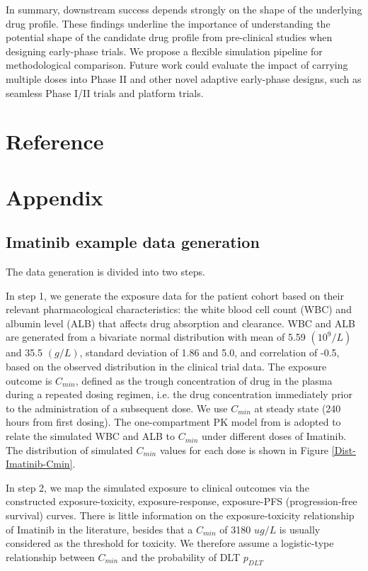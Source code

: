 \documentclass[11pt]{article}
\providecommand{\DIFaddtex}[1]{{\protect\color{blue}\uwave{#1}}} %
\providecommand{\DIFaddbegin}{} %
\providecommand{\DIFaddend}{} %
\providecommand{\DIFadd}[1]{\texorpdfstring{\DIFaddtex{#1}}{#1}} %
\newcommand{\DIFaddincludegraphics}[2][]{{\color{blue}\fbox{\DIFOincludegraphics[#1]{#2}}}} %
\DeclareRobustCommand{\DIFaddbegin}{\DIFOaddbegin \let\includegraphics\DIFaddincludegraphics} %
\DeclareRobustCommand{\DIFaddend}{\DIFOaddend \let\includegraphics\DIFOincludegraphics} %
\begin{document}
In summary, downstream success depends strongly on the shape of the underlying drug profile. These findings underline the importance of understanding the potential shape of the candidate drug profile from pre-clinical studies when designing early-phase trials. We propose a flexible simulation pipeline for methodological comparison. Future work could \DIFaddbegin \DIFadd{utilize this framework to }\DIFaddend evaluate the impact of carrying multiple doses into Phase II and other novel adaptive early-phase designs, such as seamless Phase I/II trials and platform trials.


\newpage
{}
\section*{Reference}
\printbibliography [heading=none]

\appendix
\renewcommand{\thefigure}{S\arabic{figure}}
\setcounter{figure}{0}
\renewcommand{\thetable}{S\arabic{table}}
\setcounter{table}{0}
\newpage
\section*{Appendix}
\subsection*{Imatinib example data generation}
The data generation is divided into two steps. 

In step 1, we generate the exposure data for the patient cohort based on their relevant pharmacological characteristics: the white blood cell count (WBC) and albumin level (ALB) that affects drug absorption and clearance. WBC and ALB are generated from a bivariate normal distribution with mean of 5.59 $(10^9/L)$ and 35.5 $(g/L)$, standard deviation of 1.86 and 5.0, and correlation of -0.5, based on the observed distribution in the clinical trial data. The exposure outcome is $C_{min}$, defined as the trough concentration of drug in the plasma during a repeated dosing regimen, i.e. the drug concentration immediately prior to the administration of a subsequent dose. We use $C_{min}$ at steady state (240 hours from first dosing). The one-compartment PK model from \textcite{demetri2009imatinib} is adopted to relate the simulated WBC and ALB to $C_{min}$ under different doses of Imatinib. The distribution of simulated $C_{min}$ values for each dose is shown in Figure \ref{Dist-Imatinib-Cmin}.

In step 2,  we map the simulated exposure to clinical outcomes via the constructed exposure-toxicity, exposure-response, exposure-PFS (progression-free survival) curves. There is little information on the exposure-toxicity relationship of Imatinib in the literature, besides that a $C_{min}$ of 3180 $ug/L$ is usually considered as the threshold for toxicity. We therefore assume a logistic-type relationship between $C_{min}$ and the probability of DLT $p_{DLT}$
\end{document}
